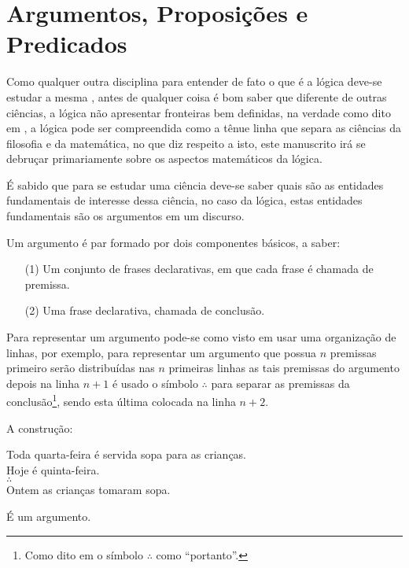 \section{Argumentos, Proposições e Predicados}\label{sec:LogicsComponents}

Como qualquer outra disciplina para entender de fato o que é a lógica deve-se estudar a mesma \cite{copi1981}, antes de qualquer coisa é bom saber que diferente de outras ciências, a lógica não apresentar fronteiras bem definidas, na verdade como dito em \cite{joaoPavao2014}, a lógica pode ser compreendida como a tênue linha que separa as ciências da filosofia e da matemática, no que diz respeito a isto, este manuscrito irá se debruçar primariamente sobre os aspectos matemáticos da lógica.

É sabido que para se estudar uma ciência deve-se saber quais são as entidades fundamentais de interesse dessa ciência, no caso da lógica, estas entidades fundamentais são os argumentos em um discurso. 

\begin{definicao}[Argumento]\label{def:Argumento}
	Um argumento é par formado por dois componentes básicos, a saber:
	\begin{itemize}
		\item[(1)] Um conjunto de frases declarativas, em que cada frase é chamada de premissa.
		\item[(2)] Uma frase declarativa, chamada de conclusão.
	\end{itemize}
\end{definicao}

Para representar um argumento pode-se como visto em \cite{copi1981, joaoPavao2014} usar uma organização de linhas, por exemplo, para representar um argumento que possua $n$ premissas primeiro serão distribuídas nas $n$ primeiras linhas as tais premissas do argumento depois na linha $n+1$ é usado o símbolo $\wasytherefore$ para separar as premissas da conclusão\footnote{Como dito em \cite{magnus2020} o símbolo $\wasytherefore$ como ``portanto''.}, sendo esta última colocada na linha $n+2$.

\begin{exemplo}\label{exe:Argumento1}
	A construção:
  \begin{center} 
    Toda quarta-feira é servida sopa para as crianças.\\
    Hoje é quinta-feira.\\
    $\wasytherefore$\\
    Ontem as crianças tomaram sopa.
  \end{center}
	É um argumento.
\end{exemplo}

